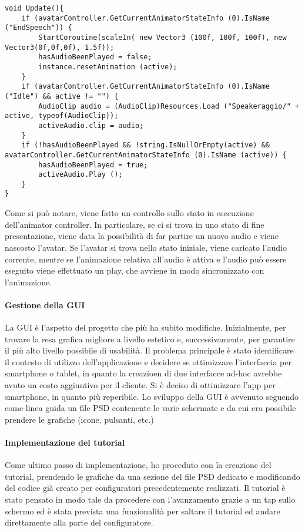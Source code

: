 \begin{lstlisting}
void Update(){
	if (avatarController.GetCurrentAnimatorStateInfo (0).IsName ("EndSpeech")) {
		StartCoroutine(scaleIn( new Vector3 (100f, 100f, 100f), new Vector3(0f,0f,0f), 1.5f));
		hasAudioBeenPlayed = false;
		instance.resetAnimation (active);
	}
	if (avatarController.GetCurrentAnimatorStateInfo (0).IsName ("Idle") && active != "") {
		AudioClip audio = (AudioClip)Resources.Load ("Speakeraggio/" + active, typeof(AudioClip));
		activeAudio.clip = audio;
	}
	if (!hasAudioBeenPlayed && !string.IsNullOrEmpty(active) && avatarController.GetCurrentAnimatorStateInfo (0).IsName (active)) {
		hasAudioBeenPlayed = true;
		activeAudio.Play ();
	}
}
\end{lstlisting}

Come si pu\`o notare, viene fatto un controllo sullo stato in esecuzione dell'animator controller. In particolare, se ci si trova in uno stato di fine presentazione, viene data la possibilit\`a di far partire un nuovo audio e viene nascosto l'avatar.
Se l'avatar si trova nello stato iniziale, viene caricato l'audio corrente, mentre se l'animazione relativa all'audio \`e attiva e l'audio pu\`o essere eseguito viene effettuato un play, che avviene in modo sincronizzato con l'animazione.\\

\paragraph{Gestione della GUI}
La GUI \`e l'aspetto del progetto che pi\`u ha subito modifiche. Inizialmente, per trovare la resa grafica migliore a livello estetico e, successivamente, per garantire il pi\`u alto livello possibile di usabilit\`a. Il problema principale \`e stato identificare il contesto di utilizzo dell'applicazione e decidere se ottimizzare l'interfaccia per smartphone o tablet, in quanto la creazioen di due interfacce ad-hoc avrebbe avuto un costo aggiuntivo per il cliente. Si \`e deciso di ottimizzare l'app per smartphone, in quanto pi\`u reperibile. Lo sviluppo della GUI \`e avvenuto seguendo come linea guida un file PSD contenente le varie schermate e da cui era possibile prendere le grafiche (icone, pulsanti, etc.)

\paragraph{Implementazione del tutorial}
Come ultimo passo di implementazione, ho proceduto con la creazione del tutorial, prendendo le grafiche da una sezione del file PSD dedicato e modificando del codice gi\`a creato per configuratori precedentemente realizzati. Il tutorial \`e stato pensato in modo tale da procedere con l'avanzamento grazie a un tap sullo schermo ed \`e stata prevista una funzionalit\`a per saltare il tutorial ed andare direttamente alla parte del configuratore.

